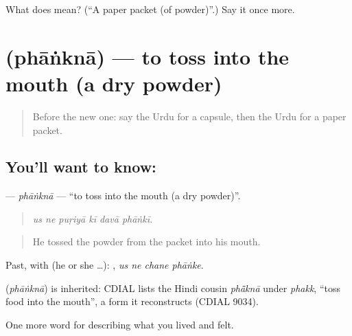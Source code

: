 \begin{tcolorbox}[breakable,colback=teal!4,colframe=teal!35!black,title={Before you move on}]
What does  mean? (\textquotedblleft{}A paper packet (of powder)\textquotedblright{}.) Say it once more.
\end{tcolorbox}
\section[\texorpdfstring{\ur{پھانکنا} (phāṅknā)}{پھانکنا (phāṅknā)}]{ (phāṅknā) — to toss into the mouth (a dry powder)}

\label{lesson:UR-C477-phankna}



\begin{quote}
Before the new one: say the Urdu for a capsule, then the Urdu for a paper packet.
\end{quote}

\subsection*{You'll want to know: }
\textbf{} — \emph{phāṅknā} — \textquotedblleft{}to toss into the mouth (a dry powder)\textquotedblright{}.

\begin{quote}
     
\end{quote}

\begin{quote}
\emph{us ne puṛiyā kī davā phāṅkī.}
\end{quote}

\begin{quote}
He tossed the powder from the packet into his mouth.
\end{quote}

Past, with  (he or she …):    , \emph{us ne chane phāṅke}.

\begin{cousinweb}
\textbf{} (\emph{phāṅknā}) is inherited: CDIAL lists the Hindi cousin \emph{phā̃knā} under \emph{phakk}, \textquotedblleft{}toss food into the mouth\textquotedblright{}, a form it reconstructs (CDIAL 9034).
\end{cousinweb}

\begin{grammarlens}[title={What you've built}]
One more word for describing what you lived and felt.
\end{grammarlens}

